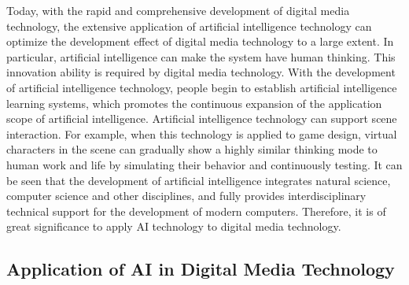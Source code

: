 \documentclass[conference]{IEEEtran}
\begin{document}
Today, with the rapid and comprehensive development of digital media technology, the extensive application of artificial intelligence technology can optimize the development effect of digital media technology to a large extent. In particular, artificial intelligence can make the system have human thinking. This innovation ability is required by digital media technology. With the development of artificial intelligence technology, people begin to establish artificial intelligence learning systems, which promotes the continuous expansion of the application scope of artificial intelligence. Artificial intelligence technology can support scene interaction. For example, when this technology is applied to game design, virtual characters in the scene can gradually show a highly similar thinking mode to human work and life by simulating their behavior and continuously testing. It can be seen that the development of artificial intelligence integrates natural science, computer science and other disciplines, and fully provides interdisciplinary technical support for the development of modern computers. Therefore, it is of great significance to apply AI technology to digital media technology.

\subsection{Application of AI in Digital Media Technology}
\end{document}
